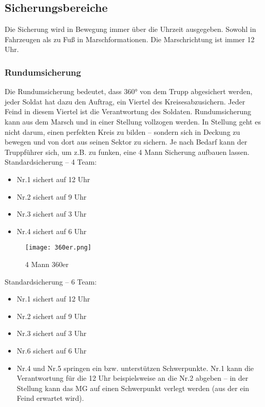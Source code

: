 \newpage

\subsection{Sicherungsbereiche}
	Die Sicherung wird in Bewegung immer über die Uhrzeit ausgegeben. Sowohl in Fahrzeugen als zu Fuß in Marschformationen.  Die Marschrichtung ist immer 12 Uhr. \\

\subsubsection{Rundumsicherung}
	Die Rundumsicherung bedeutet, dass 360° von dem Trupp abgesichert werden, jeder Soldat hat dazu den Auftrag, ein Viertel des \glqq Kreises\grqq abzusichern. Jeder Feind in diesem Viertel ist die Verantwortung des Soldaten. Rundumsicherung kann aus dem Marsch und in einer Stellung vollzogen werden. In Stellung geht es nicht darum, einen perfekten Kreis zu bilden – sondern sich in Deckung zu bewegen und von dort aus seinen Sektor zu sichern. Je nach Bedarf kann der Truppführer sich, um z.B. zu funken, eine 4 Mann Sicherung aufbauen lassen. \\
	Standardsicherung  – 4 Team: 
		\begin{itemize}
			\item Nr.1 sichert auf 12 Uhr 
			\item Nr.2 sichert auf 9 Uhr 
			\item Nr.3 sichert auf 3 Uhr 
			\item Nr.4 sichert auf 6 Uhr 
		\end{itemize}

		\begin{figure}[htbp]
			\centering
			\texttt{[image: 360er.png]}
			\caption{4 Mann 360er}
		\end{figure}

	Standardsicherung – 6 Team: 
		\begin{itemize}
			\item Nr.1 sichert auf 12 Uhr 
			\item Nr.2 sichert auf 9 Uhr 
			\item Nr.3 sichert auf 3 Uhr 
			\item Nr.6 sichert auf 6 Uhr
			\item Nr.4 und Nr.5 springen ein bzw. unterstützen Schwerpunkte. Nr.1 kann die Verantwortung für die 12 Uhr beispielsweise an die Nr.2 abgeben – in der Stellung kann das MG auf einen Schwerpunkt verlegt werden (aus der ein Feind erwartet wird). 
		\end{itemize}


